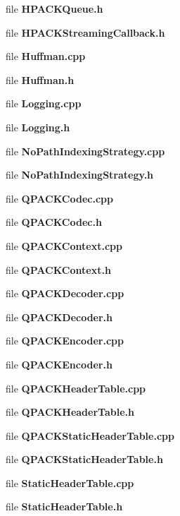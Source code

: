 \begin{DoxyCompactItemize}
\item 
file {\bf H\+P\+A\+C\+K\+Queue.\+h}
\item 
file {\bf H\+P\+A\+C\+K\+Streaming\+Callback.\+h}
\item 
file {\bf Huffman.\+cpp}
\item 
file {\bf Huffman.\+h}
\item 
file {\bf Logging.\+cpp}
\item 
file {\bf Logging.\+h}
\item 
file {\bf No\+Path\+Indexing\+Strategy.\+cpp}
\item 
file {\bf No\+Path\+Indexing\+Strategy.\+h}
\item 
file {\bf Q\+P\+A\+C\+K\+Codec.\+cpp}
\item 
file {\bf Q\+P\+A\+C\+K\+Codec.\+h}
\item 
file {\bf Q\+P\+A\+C\+K\+Context.\+cpp}
\item 
file {\bf Q\+P\+A\+C\+K\+Context.\+h}
\item 
file {\bf Q\+P\+A\+C\+K\+Decoder.\+cpp}
\item 
file {\bf Q\+P\+A\+C\+K\+Decoder.\+h}
\item 
file {\bf Q\+P\+A\+C\+K\+Encoder.\+cpp}
\item 
file {\bf Q\+P\+A\+C\+K\+Encoder.\+h}
\item 
file {\bf Q\+P\+A\+C\+K\+Header\+Table.\+cpp}
\item 
file {\bf Q\+P\+A\+C\+K\+Header\+Table.\+h}
\item 
file {\bf Q\+P\+A\+C\+K\+Static\+Header\+Table.\+cpp}
\item 
file {\bf Q\+P\+A\+C\+K\+Static\+Header\+Table.\+h}
\item 
file {\bf Static\+Header\+Table.\+cpp}
\item 
file {\bf Static\+Header\+Table.\+h}
\end{DoxyCompactItemize}
